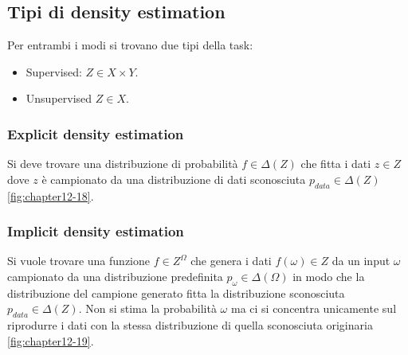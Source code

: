 \subsection{Tipi di density estimation}
Per entrambi i modi si trovano due tipi della task:
\begin{itemize}
	\item Supervised: $Z\in X\times Y$.
	\item Unsupervised $Z\in X$.
\end{itemize}

\subsubsection{Explicit density estimation}
Si deve trovare una distribuzione di probabilit\`a $f\in \Delta(Z)$ che fitta i dati $z\in Z$ dove $z$ \`e campionato da una distribuzione di dati sconosciuta $p_{data}\in\Delta(Z)$ \ref{fig:chapter12-18}.

\subsubsection{Implicit density estimation}
Si vuole trovare una funzione $f\in Z^\Omega$ che genera i dati $f(\omega)\in Z$ da un input $\omega$ campionato da una distribuzione predefinita $p_\omega\in\Delta(\Omega)$ in modo che la distribuzione del campione generato fitta la distribuzione sconosciuta $p_{data}\in\Delta(Z)$.
Non si stima la probabilit\`a $\omega$ ma ci si concentra unicamente sul riprodurre i dati con la stessa distribuzione di quella sconosciuta originaria \ref{fig:chapter12-19}.

